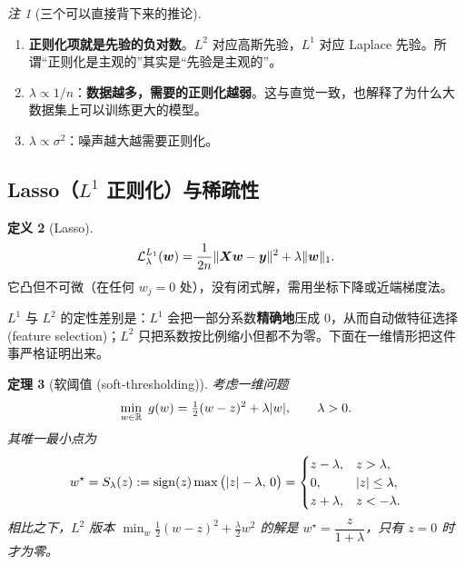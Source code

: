 \documentclass[UTF8,a4paper,11pt]{ctexart}
\theoremstyle{definition}
\newtheorem{definition}{定义}[section]
\theoremstyle{plain}
\newtheorem{theorem}[definition]{定理}
\theoremstyle{remark}
\newtheorem{remark}[definition]{注}
\DeclarePairedDelimiter{\norm}{\lVert}{\rVert}
\DeclarePairedDelimiter{\abs}{\lvert}{\rvert}
\DeclareMathOperator{\sgn}{sign}
\newcommand{\R}{\mathbb{R}}
\newcommand{\Loss}{\mathcal{L}}
\newcommand{\eng}[1]{\textup{(#1)}}
\begin{document}
\begin{remark}[三个可以直接背下来的推论]
\begin{enumerate}[label=(\arabic*)]
  \item \textbf{正则化项就是先验的负对数}。$L^2$ 对应高斯先验，$L^1$ 对应 Laplace 先验。所谓“正则化是主观的”其实是“先验是主观的”。
  \item $\lambda\propto1/n$：\textbf{数据越多，需要的正则化越弱}。这与直觉一致，也解释了为什么大数据集上可以训练更大的模型。
  \item $\lambda\propto\sigma^2$：噪声越大越需要正则化。
\end{enumerate}
\end{remark}

\subsection{Lasso（$L^1$ 正则化）与稀疏性}

\begin{definition}[Lasso]
\[
  \Loss_{\lambda}^{L_1}(\bm{w})=\frac{1}{2n}\norm{\bm{X}\bm{w}-\bm{y}}^2+\lambda\norm{\bm{w}}_1 .
\]
它凸但不可微（在任何 $w_j=0$ 处），没有闭式解，需用坐标下降或近端梯度法。
\end{definition}

$L^1$ 与 $L^2$ 的定性差别是：$L^1$ 会把一部分系数\textbf{精确地}压成 $0$，从而自动做特征选择 \eng{feature selection}；$L^2$ 只把系数按比例缩小但都不为零。下面在一维情形把这件事严格证明出来。

\begin{theorem}[软阈值 \eng{soft-thresholding}]\label{thm:soft}
考虑一维问题
\[
  \min_{w\in\R}\ g(w)=\tfrac12(w-z)^2+\lambda\abs{w},\qquad\lambda>0 .
\]
其唯一最小点为
\begin{equation}\label{eq:soft}
  w^\star=S_\lambda(z):=\sgn(z)\max\big(\abs{z}-\lambda,\,0\big)
  =\begin{cases}
    z-\lambda, & z>\lambda,\\
    0, & \abs{z}\le\lambda,\\
    z+\lambda, & z<-\lambda .
  \end{cases}
\end{equation}
相比之下，$L^2$ 版本 $\min_w\tfrac12(w-z)^2+\tfrac{\lambda}{2}w^2$ 的解是 $w^\star=\dfrac{z}{1+\lambda}$，只有 $z=0$ 时才为零。
\end{theorem}
\end{document}
